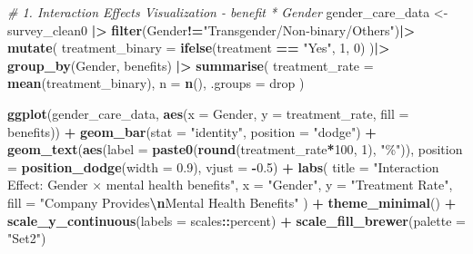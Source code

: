 \documentclass[
]{article}
\newenvironment{Shaded}{\begin{snugshade}}{\end{snugshade}}
\newcommand{\AttributeTok}[1]{\textcolor[rgb]{0.13,0.29,0.53}{#1}}
\newcommand{\CommentTok}[1]{\textcolor[rgb]{0.56,0.35,0.01}{\textit{#1}}}
\newcommand{\DecValTok}[1]{\textcolor[rgb]{0.00,0.00,0.81}{#1}}
\newcommand{\FloatTok}[1]{\textcolor[rgb]{0.00,0.00,0.81}{#1}}
\newcommand{\FunctionTok}[1]{\textcolor[rgb]{0.13,0.29,0.53}{\textbf{#1}}}
\newcommand{\NormalTok}[1]{#1}
\newcommand{\OtherTok}[1]{\textcolor[rgb]{0.56,0.35,0.01}{#1}}
\newcommand{\SpecialCharTok}[1]{\textcolor[rgb]{0.81,0.36,0.00}{\textbf{#1}}}
\newcommand{\StringTok}[1]{\textcolor[rgb]{0.31,0.60,0.02}{#1}}
\begin{document}
\begin{Shaded}
\begin{Highlighting}[]
\CommentTok{\# 1. Interaction Effects Visualization {-} benefit * Gender}
\NormalTok{gender\_care\_data }\OtherTok{\textless{}{-}}\NormalTok{ survey\_clean0 }\SpecialCharTok{|\textgreater{}}
  \FunctionTok{filter}\NormalTok{(Gender}\SpecialCharTok{!=}\StringTok{"Transgender/Non{-}binary/Others"}\NormalTok{)}\SpecialCharTok{|\textgreater{}}
  \FunctionTok{mutate}\NormalTok{(}
    \AttributeTok{treatment\_binary =} \FunctionTok{ifelse}\NormalTok{(treatment }\SpecialCharTok{==} \StringTok{"Yes"}\NormalTok{, }\DecValTok{1}\NormalTok{, }\DecValTok{0}\NormalTok{)}
\NormalTok{  )}\SpecialCharTok{|\textgreater{}}
  \FunctionTok{group\_by}\NormalTok{(Gender, benefits) }\SpecialCharTok{|\textgreater{}}
  \FunctionTok{summarise}\NormalTok{(}
    \AttributeTok{treatment\_rate =} \FunctionTok{mean}\NormalTok{(treatment\_binary),}
    \AttributeTok{n =} \FunctionTok{n}\NormalTok{(),}
    \AttributeTok{.groups =} \StringTok{\textquotesingle{}drop\textquotesingle{}}
\NormalTok{  )}

\FunctionTok{ggplot}\NormalTok{(gender\_care\_data, }\FunctionTok{aes}\NormalTok{(}\AttributeTok{x =}\NormalTok{ Gender, }\AttributeTok{y =}\NormalTok{ treatment\_rate, }\AttributeTok{fill =}\NormalTok{ benefits)) }\SpecialCharTok{+}
  \FunctionTok{geom\_bar}\NormalTok{(}\AttributeTok{stat =} \StringTok{"identity"}\NormalTok{, }\AttributeTok{position =} \StringTok{"dodge"}\NormalTok{) }\SpecialCharTok{+}
  \FunctionTok{geom\_text}\NormalTok{(}\FunctionTok{aes}\NormalTok{(}\AttributeTok{label =} \FunctionTok{paste0}\NormalTok{(}\FunctionTok{round}\NormalTok{(treatment\_rate}\SpecialCharTok{*}\DecValTok{100}\NormalTok{, }\DecValTok{1}\NormalTok{), }\StringTok{"\%"}\NormalTok{)), }
            \AttributeTok{position =} \FunctionTok{position\_dodge}\NormalTok{(}\AttributeTok{width =} \FloatTok{0.9}\NormalTok{), }\AttributeTok{vjust =} \SpecialCharTok{{-}}\FloatTok{0.5}\NormalTok{) }\SpecialCharTok{+}
  \FunctionTok{labs}\NormalTok{(}
    \AttributeTok{title =} \StringTok{"Interaction Effect: Gender × mental health benefits"}\NormalTok{,}
    \AttributeTok{x =} \StringTok{"Gender"}\NormalTok{,}
    \AttributeTok{y =} \StringTok{"Treatment Rate"}\NormalTok{,}
    \AttributeTok{fill =} \StringTok{"Company Provides}\SpecialCharTok{\textbackslash{}n}\StringTok{Mental Health Benefits"}
\NormalTok{  ) }\SpecialCharTok{+}
  \FunctionTok{theme\_minimal}\NormalTok{() }\SpecialCharTok{+}
  \FunctionTok{scale\_y\_continuous}\NormalTok{(}\AttributeTok{labels =}\NormalTok{ scales}\SpecialCharTok{::}\NormalTok{percent) }\SpecialCharTok{+}
  \FunctionTok{scale\_fill\_brewer}\NormalTok{(}\AttributeTok{palette =} \StringTok{"Set2"}\NormalTok{)}
\end{Highlighting}
\end{Shaded}
\end{document}
